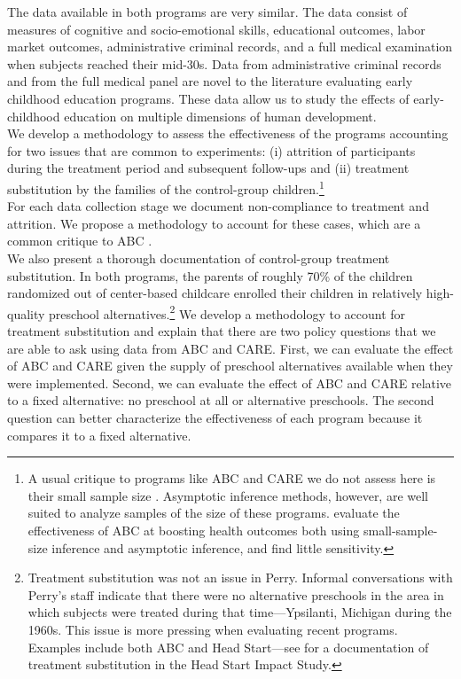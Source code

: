 \noindent The data available in both programs are very similar. The data consist of measures of cognitive and socio-emotional skills, educational outcomes, labor market outcomes, administrative criminal records, and a full medical examination when subjects reached their mid-30s. Data from administrative criminal records and from the full medical panel are novel to the literature evaluating early childhood education programs. These data allow us to study the effects of early-childhood education on multiple dimensions of human development.\\

\noindent We develop a methodology to assess the effectiveness of the programs accounting for two issues that are common to experiments: (i) attrition of participants during the treatment period and subsequent follow-ups and (ii) treatment substitution by the families of the control-group children.\footnote{A usual critique to programs like ABC and CARE we do not assess here is their small sample size \citep{Hanushek_Lindseth_2009_BOOKSchoolhousesCourthouses}. Asymptotic inference methods, however, are well suited to analyze samples of the size of these programs. \citet{Campbell_Conti_etal_2014_EarlyChildhoodInvestments} evaluate the effectiveness of ABC at boosting health outcomes both using small-sample-size inference and asymptotic inference, and find little sensitivity.}\\

\noindent For each data collection stage we document non-compliance to treatment and attrition. We propose a methodology to account for these cases, which are a common critique to ABC \citep{Spitz_1992_ABC-Retardation,Hu_2014_ABC-Study}.\\

\noindent We also present a thorough documentation of control-group treatment substitution. In both programs, the parents of roughly 70\% of the children randomized out of center-based childcare enrolled their children in relatively high-quality preschool alternatives.\footnote{Treatment substitution was not an issue in Perry. Informal conversations with Perry's staff indicate that there were no alternative preschools in the area in which subjects were treated during that time---Ypsilanti, Michigan during the 1960s. This issue is more pressing when evaluating recent programs. Examples include both ABC and Head Start---see \citep{Puma_Bell_etal_2010_HeadStartImpact} for a documentation of treatment substitution in the Head Start Impact Study.} We develop a methodology to account for treatment substitution and explain that there are two policy questions that we are able to ask using data from ABC and CARE. First, we can evaluate the effect of ABC and CARE given the supply of preschool alternatives available when they were implemented. Second, we can evaluate the effect of ABC and CARE relative to a fixed alternative: no preschool at all or alternative preschools. The second question can better characterize the effectiveness of each program because it compares it to a fixed alternative.\\

